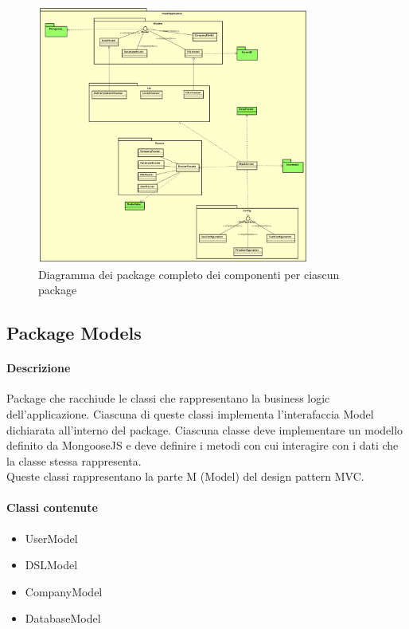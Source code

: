 \begin{figure}[H]
\centering
\includegraphics[width=0.8\textwidth]{res/sections/backend/collegamenti.png}
\caption{Diagramma dei package completo dei componenti per ciascun package}
\end{figure}

\subsection{Package Models}
\paragraph*{Descrizione}
Package che racchiude le classi che rappresentano la business logic dell'applicazione. Ciascuna di queste classi implementa l'interafaccia Model dichiarata all'interno del package.
Ciascuna classe deve implementare un modello definito da MongooseJS e deve definire i metodi con cui interagire con i dati che la classe stessa rappresenta. \\
Queste classi rappresentano la parte M (Model) del design pattern MVC.

\paragraph*{Classi contenute}
\begin{itemize}
\item UserModel
\item DSLModel
\item CompanyModel
\item DatabaseModel
\end{itemize}

